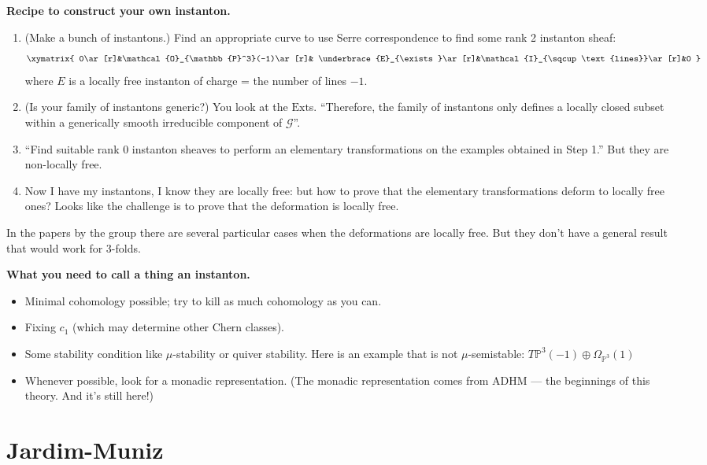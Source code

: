 \documentclass{book}
\begin{document}
\medskip\noindent
{\bf Recipe to construct your own instanton.}
\begin{enumerate}
\item (Make a bunch of instantons.) Find an
appropriate curve to
use Serre correspondence to find some
rank 2 instanton sheaf:
$$
\xymatrix{
0\ar[r]&\mathcal{O}_{\mathbb{P}^3}(-1)\ar[r]&
\underbrace{E}_{\exists
}\ar[r]&\mathcal{I}_{\sqcup
\text{lines}}\ar[r]&0
}
$$
where $E$ is a locally free instanton
of charge = the number of lines $-1$.

\item (Is your family of instantons generic?)
You look at the $\text{Ext}$s.
``Therefore, the family of instantons only
defines a locally closed subset
within a generically smooth irreducible
component of $\mathcal{G}$''.

\item ``Find suitable rank 0 instanton
sheaves
 to perform an elementary
transformations on the examples obtained in
Step 1.'' But they are non-locally
free.

\item Now I have my instantons, I know they
are locally free: but how to prove
that the elementary transformations deform
to locally free ones? Looks like
the challenge is to prove that the
deformation is locally free.
\end{enumerate}

In the papers by the group there are several
particular cases when the
deformations are locally free. But they don't
have a general result that would
work for 3-folds.

\medskip\noindent
{\bf What you need to call a thing an
instanton.}
\begin{itemize}
\item Minimal cohomology possible;
try to kill as much cohomology as you can.
\item Fixing $c_1$ (which may determine other
Chern classes).
\item Some stability condition
like $\mu$-stability or quiver stability.
Here is an example that is not
$\mu$-semistable:
$T\mathbb{P}^3(-1)\oplus\Omega_{\mathbb{P}^3}
(1)$
\item Whenever possible,
look for a monadic representation.
(The monadic
representation comes from ADHM ---
the beginnings of this theory.
And it's still here!)
\end{itemize}

\section{Jardim-Muniz}
\label{section-jardim-muniz}
\end{document}
